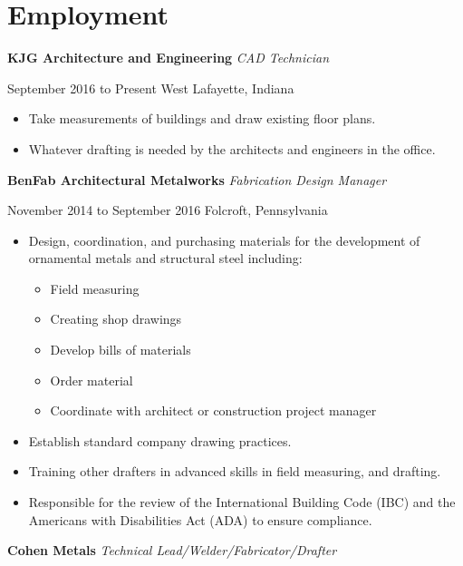 \documentclass[9pt]{extarticle}
\begin{document}
\section*{Employment} 

\textbf{KJG Architecture and Engineering} \hfill \textit{CAD Technician}

September 2016 to Present \hfill West Lafayette, Indiana

\begin{itemize}
    \item Take measurements of buildings and draw existing floor plans. 
    \item Whatever drafting is needed by the architects and engineers in the office.
    \end{itemize}

\textbf{BenFab Architectural Metalworks} \hfill \textit{Fabrication Design Manager}

November 2014 to September 2016 \hfill Folcroft, Pennsylvania

\begin{itemize}
    \item Design, coordination, and purchasing materials for the development of ornamental metals and structural steel including: 
        \begin{multicols}{2}
        \begin{itemize}
            \item Field measuring
            \item Creating shop drawings 
            \item Develop bills of materials 
                \columnbreak
            \item Order material  
            \item Coordinate with architect or construction project manager
            \end{itemize}
        \end{multicols}
    \item Establish standard company drawing practices.
    \item Training other drafters in advanced skills in field measuring, and drafting. 
    \item Responsible for the review of the International Building Code (IBC) and the Americans with Disabilities Act (ADA) to ensure compliance.
\end{itemize}

\hfill

\textbf{Cohen Metals} \hfill \textit{Technical Lead/Welder/Fabricator/Drafter}
\end{document}
